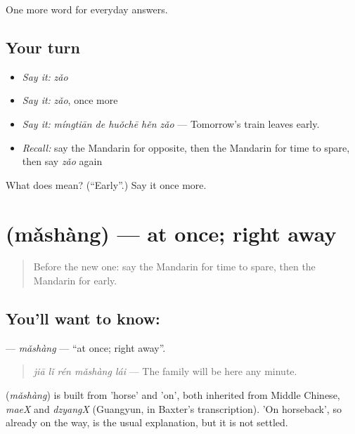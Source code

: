 \begin{grammarlens}[title={What you've built}]
One more word for everyday answers.
\end{grammarlens}

\subsection*{Your turn}
\begin{itemize}
\raggedright
  \item \emph{Say it:} \emph{zǎo}
  \item \emph{Say it:} \emph{zǎo}, once more
  \item \emph{Say it:} \emph{míngtiān de huǒchē hěn zǎo} — Tomorrow's train leaves early.
  \item \emph{Recall:} say the Mandarin for opposite, then the Mandarin for time to spare, then say \emph{zǎo} again
\end{itemize}

\begin{tcolorbox}[breakable,colback=teal!4,colframe=teal!35!black,title={Before you move on}]
What does  mean? (\textquotedblleft{}Early\textquotedblright{}.) Say it once more.
\end{tcolorbox}
\section[\texorpdfstring{\zh{马上} (mǎshàng)}{马上 (mǎshàng)}]{ (mǎshàng) — at once; right away}

\label{lesson:ZH-C83-mashang}



\begin{quote}
Before the new one: say the Mandarin for time to spare, then the Mandarin for early.
\end{quote}

\subsection*{You'll want to know: }
\textbf{} — \emph{mǎshàng} — \textquotedblleft{}at once; right away\textquotedblright{}.

\begin{quote}
\textbf{} \emph{jiā lǐ rén mǎshàng lái} — The family will be here any minute.
\end{quote}

\begin{cousinweb}
\textbf{} (\emph{mǎshàng}) is built from  'horse' and  'on', both inherited from Middle Chinese, \emph{maeX} and \emph{dzyangX} (Guangyun, in Baxter's transcription). 'On horseback', so already on the way, is the usual explanation, but it is not settled.
\end{cousinweb}


